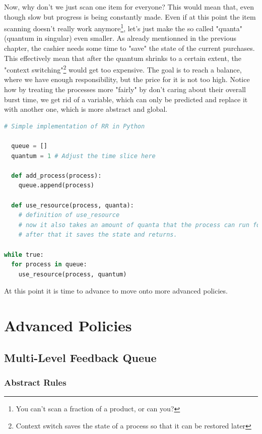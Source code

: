 \documentclass{report}
\newcounter{defi}[section]\setcounter{defi}{0}
\begin{document}
Now, why don't we just scan one item for everyone? 
This would mean that, even though slow but progress is being constantly made.
Even if at this point the item scanning doesn't really work anymore\footnote{You can't scan a fraction of a product, or can you?}, let's just make the so called "quanta" (quantum in singular) even smaller.
As already mentionned in the previous chapter, the cashier needs some time to "save" the state of the current purchases. 
This effectively mean that after the quantum shrinks to a certain extent, the "context switching"\footnote{Context switch saves the state of a process so that it can be restored later} would get too expensive. 
The goal is to reach a balance, where we have enough responsibility, but the price for it is not too high.
Notice how by treating the processes more "fairly" by don't caring about their overall burst time, we get rid of a variable, which can only be predicted and replace it with another one, which is more abstract and global.
\pagebreak
\begin{lstlisting}[language=Python, style=colorEX, label=cd:rr-python]
  # Simple implementation of RR in Python

  queue = []
  quantum = 1 # Adjust the time slice here

  def add_process(process):
    queue.append(process)

  def use_resource(process, quanta):
    # definition of use_resource
    # now it also takes an amount of quanta that the process can run for
    # after that it saves the state and returns.

while true:
  for process in queue:
    use_resource(process, quantum)

\end{lstlisting}

At this point it is time to advance to move onto more advanced policies.

\part{Advanced Policies}


\chapter{Multi-Level Feedback Queue}

\section{Abstract Rules}
\end{document}
